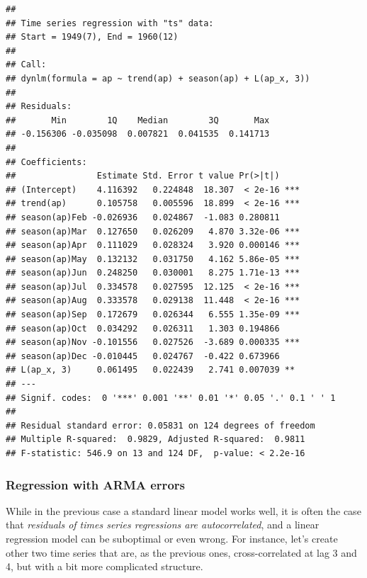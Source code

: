 \documentclass[
]{article}
\begin{document}
\begin{verbatim}
## 
## Time series regression with "ts" data:
## Start = 1949(7), End = 1960(12)
## 
## Call:
## dynlm(formula = ap ~ trend(ap) + season(ap) + L(ap_x, 3))
## 
## Residuals:
##       Min        1Q    Median        3Q       Max 
## -0.156306 -0.035098  0.007821  0.041535  0.141713 
## 
## Coefficients:
##                Estimate Std. Error t value Pr(>|t|)    
## (Intercept)    4.116392   0.224848  18.307  < 2e-16 ***
## trend(ap)      0.105758   0.005596  18.899  < 2e-16 ***
## season(ap)Feb -0.026936   0.024867  -1.083 0.280811    
## season(ap)Mar  0.127650   0.026209   4.870 3.32e-06 ***
## season(ap)Apr  0.111029   0.028324   3.920 0.000146 ***
## season(ap)May  0.132132   0.031750   4.162 5.86e-05 ***
## season(ap)Jun  0.248250   0.030001   8.275 1.71e-13 ***
## season(ap)Jul  0.334578   0.027595  12.125  < 2e-16 ***
## season(ap)Aug  0.333578   0.029138  11.448  < 2e-16 ***
## season(ap)Sep  0.172679   0.026344   6.555 1.35e-09 ***
## season(ap)Oct  0.034292   0.026311   1.303 0.194866    
## season(ap)Nov -0.101556   0.027526  -3.689 0.000335 ***
## season(ap)Dec -0.010445   0.024767  -0.422 0.673966    
## L(ap_x, 3)     0.061495   0.022439   2.741 0.007039 ** 
## ---
## Signif. codes:  0 '***' 0.001 '**' 0.01 '*' 0.05 '.' 0.1 ' ' 1
## 
## Residual standard error: 0.05831 on 124 degrees of freedom
## Multiple R-squared:  0.9829, Adjusted R-squared:  0.9811 
## F-statistic: 546.9 on 13 and 124 DF,  p-value: < 2.2e-16
\end{verbatim}

\hypertarget{regression-with-arma-errors}{%
\subsubsection{Regression with ARMA errors}\label{regression-with-arma-errors}}

While in the previous case a standard linear model works well, it is often the case that \emph{residuals of times series regressions are autocorrelated}, and a linear regression model can be suboptimal or even wrong. For instance, let's create other two time series that are, as the previous ones, cross-correlated at lag 3 and 4, but with a bit more complicated structure.
\end{document}
